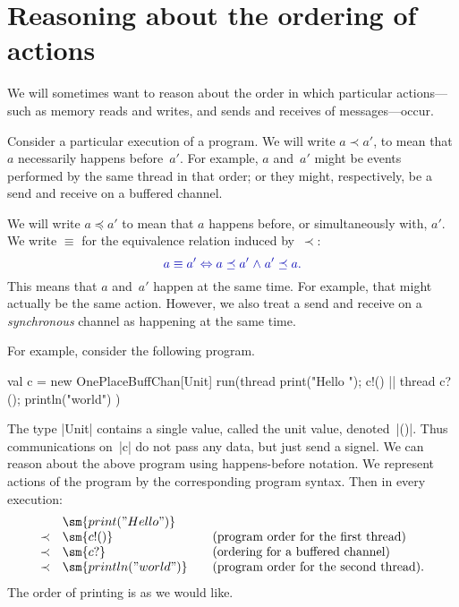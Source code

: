 
\section{Reasoning about the ordering of actions}

We will sometimes want to reason about the order in which particular
actions---such as memory reads and writes, and sends and receives of
messages---occur.

Consider a particular execution of a program.  We will write $a \prec a'$, to
mean that $a$ necessarily happens before~$a'$.  For example, $a$ and~$a'$
might be events performed by the same thread in that order; or they might,
respectively, be a send and receive on a buffered channel.

We will write $a \preceq a'$ to mean that $a$ happens before, or
simultaneously with, $a'$.  
%
We write $\equiv$ for the equivalence relation induced by~$\prec$:
\[\mstyle
a \equiv a' \iff a \preceq a' \land a' \preceq a.
\]
This means that $a$ and~$a'$ happen at the same time.  For example, that might
actually be the same action.  However, we also treat a send and receive on a
\emph{synchronous} channel as happening at the same time.

For example, consider the following program.
\begin{scala}
  val c = new OnePlaceBuffChan[Unit]
  run(thread{ print("Hello "); c!() } || thread{ c?(); println("world") })
\end{scala}
%
The type |Unit| contains a single value, called the unit value, denoted~|()|.
Thus communications on~|c| do not pass any data, but just send a signel.
%
We can reason about the above program using happens-before notation.  We
represent actions of the program by the corresponding program syntax.  Then in
every execution:
\[
\begin{array}{cl@{\qquad}l}
& \sm{print("Hello ")} \\
\prec & \sm{c!()} & \mbox{(program order for the first thread)} \\
\prec & \sm{c?{}} & \mbox{(ordering for a buffered channel)} \\
\prec & \sm{println("world")} & \mbox{(program order for the second thread).}
\end{array}
\]
The order of printing is as we would like. 

